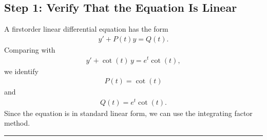 \documentclass[letterpaper,10pt,english]{sphinxmanual}
\begin{document}
\subsection{Step 1: Verify That the Equation Is Linear}
\label{\detokenize{Language/Science_language/ODE_calculus/course_MATH_3035/homework_assignments/index_pdf:step-1-verify-that-the-equation-is-linear}}
\sphinxAtStartPar
A first\sphinxhyphen{}order linear differential equation has the form
\begin{equation*}
\begin{split}y' + P(t)y = Q(t).\end{split}
\end{equation*}
\sphinxAtStartPar
Comparing with
\begin{equation*}
\begin{split}y' + \cot(t)\,y = e^t\cot(t),\end{split}
\end{equation*}
\sphinxAtStartPar
we identify
\begin{equation*}
\begin{split}P(t)=\cot(t)\end{split}
\end{equation*}
\sphinxAtStartPar
and
\begin{equation*}
\begin{split}Q(t)=e^t\cot(t).\end{split}
\end{equation*}
\sphinxAtStartPar
Since the equation is in standard linear form, we can use the integrating factor method.


\bigskip\hrule\bigskip
\end{document}
